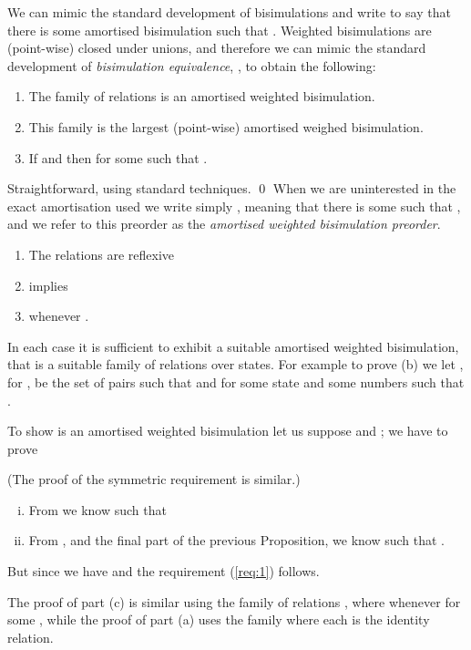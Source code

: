 \documentclass{LMCS}
\begin{document}
We can mimic the standard development of bisimulations and
write  to say that there is some amortised
bisimulation  such that .
Weighted bisimulations are (point-wise) closed under unions, and therefore we can
mimic the standard development of \emph{bisimulation equivalence}, \cite{ccs},
to obtain the following:
\begin{prop}\label{prop:amort.prop}\hfill
  \begin{enumerate}[\em(a)]
  \item The family of relations  is an 
amortised  weighted bisimulation.
  \item This family is the largest (point-wise) amortised weighed bisimulation.
  \item If  and  then  for some
         such that .
  \end{enumerate}
\end{prop}
\proof
Straightforward, using standard techniques.
\qed
When we are uninterested in the exact amortisation used we write simply
, meaning that there is some  such that ,
and we refer to this preorder as the \emph{amortised weighted bisimulation preorder}.
\begin{prop}\hfill
  \begin{enumerate}[\em(a)]
  \item  The relations  are reflexive 
  \item  implies 
  \item  whenever  . 
  \end{enumerate}
\end{prop}
\proof
In each case it is sufficient to exhibit a suitable amortised weighted bisimulation, that
is a suitable family of relations over states. For example to prove (b) we let
, for , be the set of pairs  such that
 and 
for some state  and some numbers  such that . 

To show  is an amortised weighted
bisimulation let us suppose  and ; we have to prove

(The proof of the symmetric requirement is similar.)
\begin{enumerate}[(i)]
\item From  we know  such that 


\item From , and the final part of the previous Proposition,
we know  such that 
.
\end{enumerate}
But since  we have
 and the requirement (\ref{req:1}) follows. 

The proof of part (c) is similar using the family of relations
, where  whenever  for some , while the proof of part (a) uses the family
where each  is the identity relation.
\end{document}

